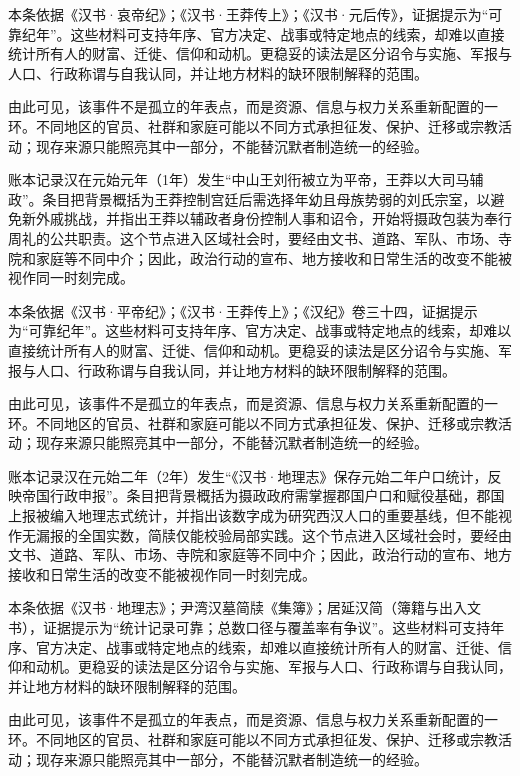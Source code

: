 本条依据《汉书·哀帝纪》；《汉书·王莽传上》；《汉书·元后传》，证据提示为“可靠纪年”。这些材料可支持年序、官方决定、战事或特定地点的线索，却难以直接统计所有人的财富、迁徙、信仰和动机。更稳妥的读法是区分诏令与实施、军报与人口、行政称谓与自我认同，并让地方材料的缺环限制解释的范围。

由此可见，该事件不是孤立的年表点，而是资源、信息与权力关系重新配置的一环。不同地区的官员、社群和家庭可能以不同方式承担征发、保护、迁移或宗教活动；现存来源只能照亮其中一部分，不能替沉默者制造统一的经验。

账本记录汉在元始元年（1年）发生“中山王刘衎被立为平帝，王莽以大司马辅政”。条目把背景概括为王莽控制宫廷后需选择年幼且母族势弱的刘氏宗室，以避免新外戚挑战，并指出王莽以辅政者身份控制人事和诏令，开始将摄政包装为奉行周礼的公共职责。这个节点进入区域社会时，要经由文书、道路、军队、市场、寺院和家庭等不同中介；因此，政治行动的宣布、地方接收和日常生活的改变不能被视作同一时刻完成。

本条依据《汉书·平帝纪》；《汉书·王莽传上》；《汉纪》卷三十四，证据提示为“可靠纪年”。这些材料可支持年序、官方决定、战事或特定地点的线索，却难以直接统计所有人的财富、迁徙、信仰和动机。更稳妥的读法是区分诏令与实施、军报与人口、行政称谓与自我认同，并让地方材料的缺环限制解释的范围。

由此可见，该事件不是孤立的年表点，而是资源、信息与权力关系重新配置的一环。不同地区的官员、社群和家庭可能以不同方式承担征发、保护、迁移或宗教活动；现存来源只能照亮其中一部分，不能替沉默者制造统一的经验。

账本记录汉在元始二年（2年）发生“《汉书·地理志》保存元始二年户口统计，反映帝国行政申报”。条目把背景概括为摄政政府需掌握郡国户口和赋役基础，郡国上报被编入地理志式统计，并指出该数字成为研究西汉人口的重要基线，但不能视作无漏报的全国实数，简牍仅能校验局部实践。这个节点进入区域社会时，要经由文书、道路、军队、市场、寺院和家庭等不同中介；因此，政治行动的宣布、地方接收和日常生活的改变不能被视作同一时刻完成。

本条依据《汉书·地理志》；尹湾汉墓简牍《集簿》；居延汉简（簿籍与出入文书），证据提示为“统计记录可靠；总数口径与覆盖率有争议”。这些材料可支持年序、官方决定、战事或特定地点的线索，却难以直接统计所有人的财富、迁徙、信仰和动机。更稳妥的读法是区分诏令与实施、军报与人口、行政称谓与自我认同，并让地方材料的缺环限制解释的范围。

由此可见，该事件不是孤立的年表点，而是资源、信息与权力关系重新配置的一环。不同地区的官员、社群和家庭可能以不同方式承担征发、保护、迁移或宗教活动；现存来源只能照亮其中一部分，不能替沉默者制造统一的经验。

